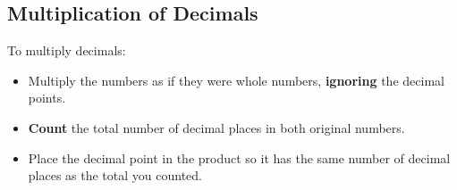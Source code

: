 \documentclass[12pt]{book}
\begin{document}
  
  
  
  
  
  
  
  
  
  
  
  \twosidedpaper
  \subsection{Multiplication of Decimals}
  
  To multiply decimals:
  \begin{itemize}
    \item Multiply the numbers as if they were whole numbers, \textbf{ignoring} the decimal points.  
    \item \textbf{Count} the total number of decimal places in both original numbers.  
    \item Place the decimal point in the product so it has the same number of decimal places as the total you counted.  
  \end{itemize}
  
\end{document}
